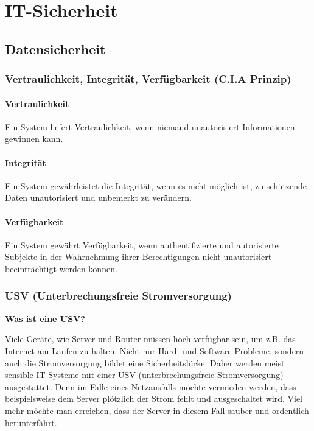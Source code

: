 \section{IT-Sicherheit}
\label{sec:IT-Sicherheit}

\subsection{Datensicherheit}
\label{sec:Datensicherheit}

\subsubsection{Vertraulichkeit, Integrität, Verfügbarkeit (C.I.A Prinzip)}
\label{sec:VertraulichkeitIntegritaetVerfuegbarkeit}


\paragraph{Vertraulichkeit} Ein System liefert Vertraulichkeit, wenn niemand unautorisiert Informationen gewinnen kann.

\paragraph{Integrität} Ein System gewährleistet die Integrität, wenn es nicht möglich ist, zu schützende Daten unautorisiert und unbemerkt zu verändern.

\paragraph{Verfügbarkeit} Ein System gewährt Verfügbarkeit, wenn authentifizierte und autorisierte Subjekte in der Wahrnehmung ihrer Berechtigungen nicht unautorisiert beeinträchtigt werden können.

\clearpage

\subsubsection{USV (Unterbrechungsfreie Stromversorgung)}
\label{sec:USV}


\textbf{Was ist eine USV?}

Viele Geräte, wie Server und Router müssen hoch verfügbar sein, um z.B. das Internet am Laufen zu halten. Nicht nur Hard- und Software Probleme, sondern auch die Stromversorgung bildet eine Sicherheitslücke. Daher werden meist sensible IT-Systeme mit einer USV (unterbrechungsfreie Stromversorgung) ausgestattet. Denn im Falle eines Netzausfalls möchte vermieden werden, dass beispielsweise dem Server plötzlich der Strom fehlt und ausgeschaltet wird. Viel mehr möchte man erreichen, dass der Server in diesem Fall sauber und ordentlich herunterfährt.

